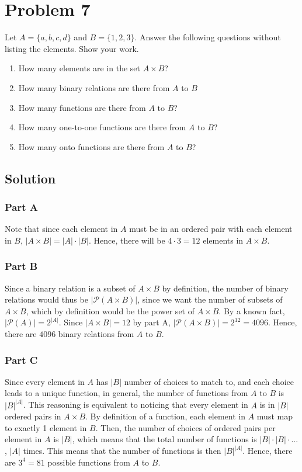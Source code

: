 \documentclass[table]{article}
\begin{document}
\section{Problem 7}
Let $A = \{a, b, c, d\}$ and $B = \{1, 2, 3\}$. Answer the following questions without listing the elements. Show your work.
\begin{enumerate}[nosep,label=\alph*)]
\item How many elements are in the set $A \times B$?
\item How many binary relations are there from $A$ to $B$
\item How many functions are there from $A$ to $B$?
\item How many one-to-one functions are there from $A$ to $B$?
\item How many onto functions are there from $A$ to $B$?
\end{enumerate}
\subsection{Solution}
\subsubsection{Part A}
Note that since each element in $A$ must be in an ordered pair with each element in $B$, $|A \times B| = |A| \cdot |B|$. Hence, there will be $4 \cdot 3 = 12$ elements in $A \times B$.
\subsubsection{Part B}
Since a binary relation is a subset of $A \times B$ by definition, the number of binary relations would thus be $|\mathcal{P}(A \times B)|$, since we want the number of subsets of $A \times B$, which by definition would be the power set of $A \times B$. By a known fact, $|\mathcal{P}(A)|=2^{|A|}$. Since $|A \times B| = 12$ by part A, $|\mathcal{P}(A \times B)|=2^{12}=4096$. Hence, there are $4096$ binary relations from $A$ to $B$.
\subsubsection{Part C}
Since every element in $A$ has $|B|$ number of choices to match to, and each choice leads to a unique function, in general, the number of functions from $A$ to $B$ is $|B|^{|A|}$. This reasoning is equivalent to noticing that every element in $A$ is in $|B|$ ordered pairs in $A \times B$. By definition of a function, each element in $A$ must map to exactly 1 element in $B$. Then, the number of choices of ordered pairs per element in $A$ is $|B|$, which means that the total number of functions is $|B| \cdot |B| \cdot ...$, $|A|$ times. This means that the number of functions is then $|B|^{|A|}$. Hence, there are $3^4=81$ possible functions from $A$ to $B$.
\end{document}
